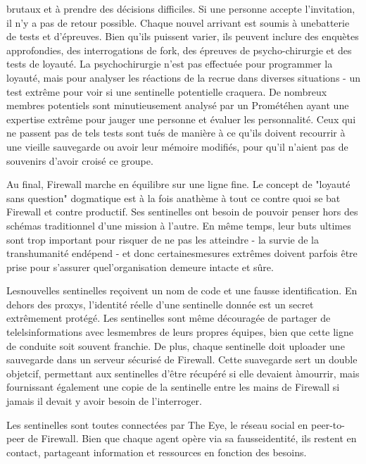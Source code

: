 brutaux et à prendre des décisions difficiles. Si une personne accepte l'invitation, il n'y a pas de retour possible. Chaque nouvel arrivant est soumis à unebatterie de tests et d'épreuves. Bien qu'ils puissent varier, ils peuvent inclure des enquètes approfondies, des interrogations de fork, des épreuves de psycho-chirurgie et des tests de loyauté. La psychochirurgie n'est pas effectuée pour programmer la loyauté, mais pour analyser les réactions de la recrue dans diverses situations - un test extrême pour voir si une sentinelle potentielle craquera. De nombreux membres potentiels sont minutieusement analysé par un Prométéhen ayant une expertise extrême pour jauger une personne et évaluer les personnalité. Ceux qui ne passent pas de tels tests sont tués de manière à ce qu'ils doivent recourrir à une vieille sauvegarde ou avoir leur mémoire modifiés, pour qu'il n'aient pas de souvenirs d'avoir croisé ce groupe. 

Au final, Firewall marche en équilibre sur une ligne fine. Le concept de "loyauté sans question" dogmatique est à la fois anathème à tout ce contre quoi se bat Firewall et contre productif. Ses sentinelles ont besoin de pouvoir penser hors des schémas traditionnel d'une mission à l'autre. En même temps, leur buts ultimes sont trop important pour risquer de ne pas les atteindre - la survie de la transhumanité endépend - et donc certainesmesures extrêmes doivent parfois être prise pour s'assurer quel'organisation demeure intacte et sûre. 

Lesnouvelles sentinelles reçoivent un nom de code et une fausse identification. En dehors des proxys, l'identité réelle d'une sentinelle donnée est un secret extrêmement protégé. Les sentinelles sont même découragée de partager de telelsinformations avec lesmembres de leurs propres équipes, bien que cette ligne de conduite soit souvent franchie. De plus, chaque sentinelle doit uploader une sauvegarde dans un serveur sécurisé de Firewall. Cette suavegarde sert un double objetcif, permettant aux sentinelles d'être récupéré si elle devaient àmourrir, mais fournissant également une copie de la sentinelle entre les mains de Firewall si jamais il devait y avoir besoin de l'interroger. 

Les sentinelles sont toutes connectées par The Eye, le réseau social en peer-to-peer de Firewall. Bien que chaque agent opère via sa fausseidentité, ils restent en contact, partageant information et ressources en fonction des besoins. 

